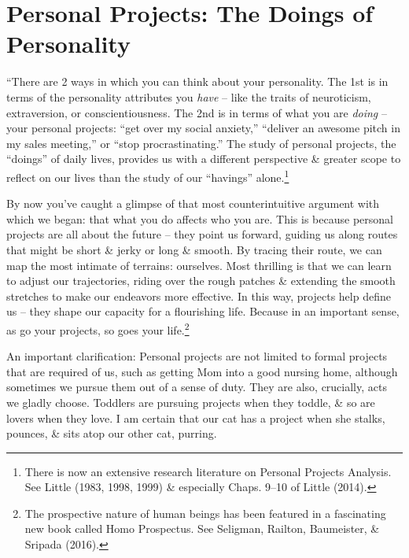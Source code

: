 \documentclass{article}
\numberwithin{equation}{section}
\begin{document}

\section{Personal Projects: The Doings of Personality}
``There are 2 ways in which you can think about your personality. The 1st is in terms of the personality attributes you \textit{have} -- like the traits of neuroticism, extraversion, or conscientiousness. The 2nd is in terms of what you are \textit{doing} -- your personal projects: ``get over my social anxiety,'' ``deliver an awesome pitch in my sales meeting,'' or ``stop procrastinating.'' The study of personal projects, the ``doings'' of daily lives, provides us with a different perspective \& greater scope to reflect on our lives than the study of our ``havings'' alone.\footnote{There is now an extensive research literature on Personal Projects Analysis. See Little (1983, 1998, 1999) \& especially Chaps. 9--10 of Little (2014).}

By now you've caught a glimpse of that most counterintuitive argument with which we began: that what you do affects who you are. This is because personal projects are all about the future -- they point us forward, guiding us along routes that might be short \& jerky or long \& smooth. By tracing their route, we can map the most intimate of terrains: ourselves. Most thrilling is that we can learn to adjust our trajectories, riding over the rough patches \& extending the smooth stretches to make our endeavors more effective. In this way, projects help define us -- they shape our capacity for a flourishing life. Because in an important sense, as go your projects, so goes your life.\footnote{The prospective nature of human beings has been featured in a fascinating new book called Homo Prospectus. See Seligman, Railton, Baumeister, \& Sripada (2016).}

An important clarification: Personal projects are not limited to formal projects that are required of us, such as getting Mom into a good nursing home, although sometimes we pursue them out of a sense of duty. They are also, crucially, acts we gladly choose. Toddlers are pursuing projects when they toddle, \& so are lovers when they love. I am certain that our cat has a project when she stalks, pounces, \& sits atop our other cat, purring.
\end{document}
